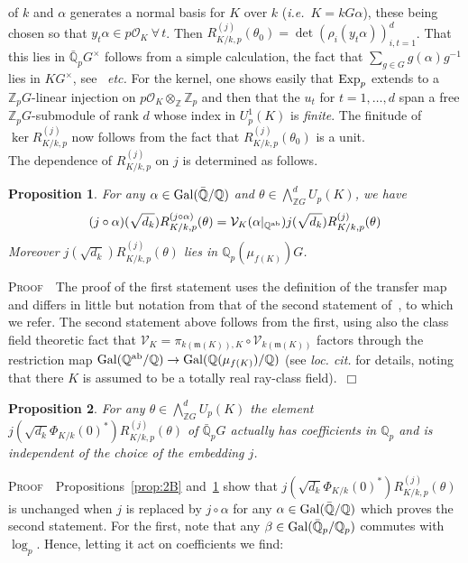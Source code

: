 \documentclass[12pt]{article}
\newtheorem{prop}{Proposition}[section]
\newcounter{rem}[section]%
\newcommand{\barbbQ}{\ensuremath{\bar{\bbQ}}}
\newcommand{\bbQ}{\ensuremath{\mathbb{Q}}}
\newcommand{\bbZ}{\ensuremath{\mathbb{Z}}}
\newcommand{\bPf}{\noindent \textsc{Proof\ }}
\newcommand{\cO}{\ensuremath{\mathcal{O}}}
\newcommand{\cV}{\ensuremath{\mathcal{V}}}
\newcommand{\ePf}{\hspace*{\fill}~$\Box$\vertsp\par}%
\newcommand{\etc}{\emph{etc.}}
\newcommand{\fm}{\ensuremath{\mathfrak{m}}}
\newcommand{\Gal}{{\rm Gal}}
\newcommand{\ie}{\emph{i.e.}}
\newcommand{\inv}{^{-1}}%
\newcommand{\rem}{\refstepcounter{rem}\noindent{\sc Remark \therem}}%
\renewcommand{\therem}{\thesection.\arabic{rem}}
\newcommand{\vertsp}{\vspace{1ex}}
\newcommand{\PhiKko}{\ensuremath{\Phi_{K/k}(0)}}
\newcommand{\PhiKkoa}{\ensuremath{\Phi_{K/k}(0)^\ast}}
\begin{document}
of $k$ and $\alpha$ generates a normal basis
for $K$ over $k$ (\ie\ $K=kG\alpha$),
these being chosen so that $y_t\alpha\in p\cO_K\ \forall\,t$.
Then $R^{(j)}_{K/k,p}(\theta_0)=\det(\rho_i(y_t\alpha))_{i,t=1}^d$.
That this lies in $\barbbQ_p G^\times$ follows from a simple calculation, the fact that
$\sum_{g\in G}g(\alpha) g\inv$ lies in $KG^\times$, see~\cite[Prop.~I.4.1]{Fro} \etc
For the kernel, one shows easily that ${\rm Exp}_p$ extends to a $\bbZ_p G$-linear
injection on $p\cO_K\otimes_\bbZ\bbZ_p$ and then that
the $u_t$ for $t=1,\ldots,d$ span a free $\bbZ_pG$-submodule of rank $d$ whose index
in $U^1_p(K)$ is \emph{finite}. The finitude of $\ker R^{(j)}_{K/k,p}$ now follows from the
fact that $R^{(j)}_{K/k,p}(\theta_0)$ is a unit.\vspace{1ex}\\
The dependence of $R^{(j)}_{K/k,p}$ on $j$
is determined as follows.
\begin{prop}\label{prop:2C}
For any $\alpha\in\Gal(\barbbQ/\bbQ)$ and $\theta\in \bigwedge_{\bbZ G}^dU_p(K)$,
we have
\[
(j\circ\alpha)(\sqrt{d_k})R^{(j\circ\alpha)}_{K/k,p}(\theta)=
\cV_{K}(\alpha|_{\bbQ^{\rm ab}})j(\sqrt{d_k})R^{(j)}_{K/k,p}(\theta)
\]
Moreover $j(\sqrt{d_k})R^{(j)}_{K/k,p}(\theta)$ lies in $\bbQ_p(\mu_{f(K)})G$.
\end{prop}
\bPf\ The proof of the first statement uses the definition of the
transfer map and differs in little but notation from that of the
second statement of~\cite[Prop.~3.2]{zetap1}, to which we refer.
The second statement above follows from the first,
using also the class field theoretic fact that $\cV_{K}=\pi_{k(\fm(K)),K}
\circ \cV_{k(\fm(K))}$ factors through the restriction map
$\Gal(\bbQ^{\rm ab}/\bbQ)\rightarrow\Gal(\bbQ(\mu_{f(K)})/\bbQ)$
(see \emph{loc. cit.} for details, noting that there $K$ is assumed to be a
totally real ray-class field).\ePf
\begin{prop}\label{prop:2D} For any $\theta\in \bigwedge_{\bbZ G}^dU_p(K)$ the element
$j(\sqrt{d_k}\PhiKko^\ast)R^{(j)}_{K/k,p}(\theta)$ of $\bar{\bbQ}_p G$
actually has coefficients in $\bbQ_p$
and is independent of the choice of the embedding $j$.
\end{prop}
\bPf\ Propositions~\ref{prop:2B} and~\ref{prop:2C} show that
$j(\sqrt{d_k}\PhiKkoa) R^{(j)}_{K/k,p}(\theta)$ is unchanged when $j$ is replaced by
$j\circ\alpha$ for any $\alpha\in\Gal(\barbbQ/\bbQ)$ which proves the second statement.
For the first, note that any $\beta\in\Gal(\barbbQ_p/\bbQ_p)$
commutes with $\log_p$. Hence, letting it act on coefficients we find:
\end{document}
